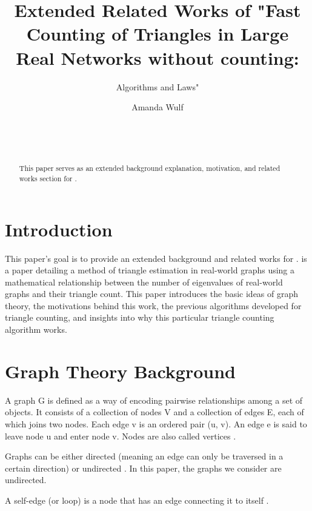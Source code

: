 \documentclass{acm_proc_article-sp}
\begin{document}
\title{Extended Related Works of "Fast Counting of Triangles in Large Real Networks without counting:}
\subtitle{Algorithms and Laws"}

\author{
\alignauthor
Amanda Wulf\\
       \\
       \\
       \\
}

\maketitle
\begin{abstract}
This paper serves as an extended background explanation, motivation, and related
works section for \cite{original}.
\end{abstract}

\section{Introduction}
This paper's goal is to provide an extended background and related works for
\cite{original}. \cite{original} is a paper detailing a method of triangle
estimation in real-world graphs using a mathematical relationship between the
number of eigenvalues of real-world graphs and their triangle count. This paper
introduces the basic ideas of graph theory, the motivations behind this work,
the previous algorithms developed for triangle counting, and insights into why
this particular triangle counting algorithm works.

\section{Graph Theory Background}
A graph G is defined as a way of encoding pairwise relationships among a set of
objects. It consists of a collection of nodes V and a collection of edges E, each
of which joins two nodes. Each edge v is an ordered pair (u, v). An edge e is
said to leave node u and enter node v. Nodes are also called vertices
\cite{kleinberg}.

Graphs can be either directed (meaning an edge can only be traversed in a
certain direction) or undirected \cite{kleinberg}. In this paper, the graphs we
consider are undirected.

A self-edge (or loop) is a node that has an edge connecting it to itself
\cite{diestel}.
\end{document}

